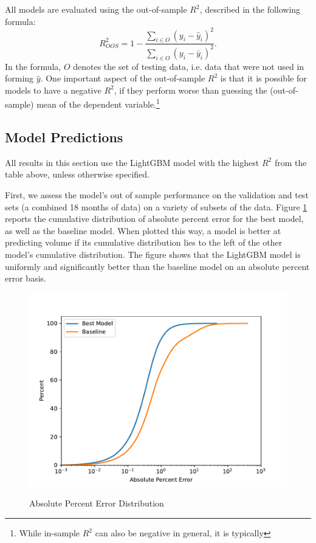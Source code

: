\documentclass[12pt]{article}
\begin{document}
All models are evaluated using the out-of-sample $R^2$, described in the following formula:
\begin{equation}
    R^2_{OOS} = 1 - \frac{\sum_{i\in O} (y_i - \hat{y}_i)^2}{\sum_{i\in O} (y_i - \bar{y}_i)^2}.
\end{equation}
In the formula, $O$ denotes the set of testing data, i.e. data that were not used in forming $\hat{y}$. One important aspect of the out-of-sample $R^2$ is that it is possible for models to have a negative $R^2$, if they perform worse than guessing the (out-of-sample) mean of the dependent variable.\footnote{While in-sample $R^2$ can also be negative in general, it is typically }



\subsection{Model Predictions}
All results in this section use the LightGBM model with the highest $R^2$ from the table above, unless otherwise specified.

First, we assess the model's out of sample performance on the validation and test sets (a combined 18 months of data) on a variety of subsets of the data. Figure \ref{fig:absolute_percent_error_distribution} reports the cumulative distribution of absolute percent error for the best model, as well as the baseline model. When plotted this way, a model is better at predicting volume if its cumulative distribution lies to the left of the other model's cumulative distribution. The figure shows that the LightGBM model is uniformly and significantly better than the baseline model on an absolute percent error basis.

\begin{figure}[H]
    \centering
    \caption{Absolute Percent Error Distribution}
    \includegraphics[width=0.75\linewidth]{../Output/absolute_percent_error_distribution.pdf}
    \label{fig:absolute_percent_error_distribution}
\end{figure}
\end{document}

